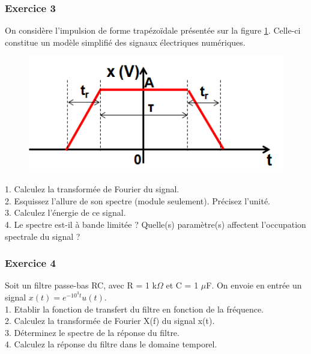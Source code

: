 	
	\subsubsection{Exercice 3}
	On considère l'impulsion de forme trapézoïdale présentée sur la figure \ref{Fig:Exo_TF_3}. Celle-ci constitue un modèle simplifié des signaux électriques numériques.
	
	\begin{figure}[h!]
		\centering
		\includegraphics[scale=0.6]{images/exo_3_TF.png}
		\label{Fig:Exo_TF_3} 
	\end{figure}

	1. Calculez la transformée de Fourier du signal.\\
	
	2. Esquissez l'allure de son spectre (module seulement). Précisez l'unité.\\
	
	3. Calculez l'énergie de ce signal.\\
	
	4. Le spectre est-il à bande limitée ? Quelle(s) paramètre(s) affectent l'occupation spectrale du signal ?\\
	

	
	\subsubsection{Exercice 4}
	Soit un filtre passe-bas RC, avec R = 1 k$\Omega$ et C = 1 $\mu$F. On envoie en entrée un signal $x(t)=e^{-10^{3}t}u(t)$.\\
	
	1. Etablir la fonction de transfert du filtre en fonction de la fréquence.\\
	
	2. Calculez la transformée de Fourier X(f) du signal x(t).\\
	
	3. Déterminez le spectre de la réponse du filtre.\\
	
	4. Calculez la réponse du filtre dans le domaine temporel.\\